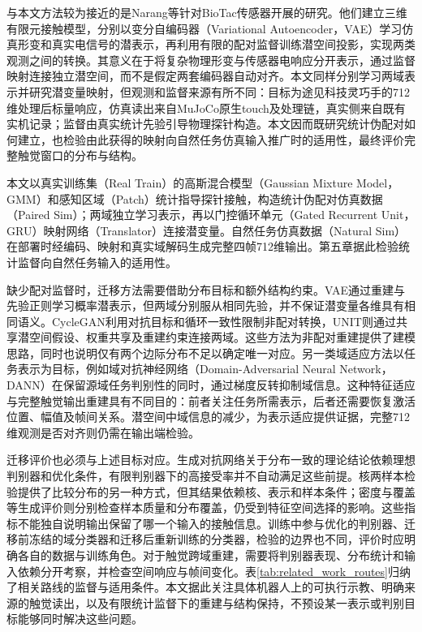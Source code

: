 与本文方法较为接近的是Narang等针对BioTac传感器开展的研究。他们建立三维有限元接触模型，分别以变分自编码器（Variational Autoencoder，VAE）学习仿真形变和真实电信号的潜表示，再利用有限的配对监督训练潜空间投影，实现两类观测之间的转换\cite{narang2021latentprojections}。其意义在于将复杂物理形变与传感器电响应分开表示，通过监督映射连接独立潜空间，而不是假定两套编码器自动对齐。本文同样分别学习两域表示并研究潜变量映射，但观测和监督来源有所不同：目标为途见科技灵巧手的712维处理后标量响应，仿真读出来自MuJoCo原生touch及处理链，真实侧来自既有实机记录；监督由真实统计先验引导物理探针构造。本文因而既研究统计伪配对如何建立，也检验由此获得的映射向自然任务仿真输入推广时的适用性，最终评价完整触觉窗口的分布与结构。

本文以真实训练集（Real Train）的高斯混合模型（Gaussian Mixture Model，GMM）和感知区域（Patch）统计指导探针接触，构造统计伪配对仿真数据（Paired Sim）；两域独立学习表示，再以门控循环单元（Gated Recurrent Unit，GRU）映射网络（Translator）连接潜变量。自然任务仿真数据（Natural Sim）在部署时经编码、映射和真实域解码生成完整四帧712维输出。第五章据此检验统计监督向自然任务输入的适用性。

缺少配对监督时，迁移方法需要借助分布目标和额外结构约束。VAE通过重建与先验正则学习概率潜表示，但两域分别服从相同先验，并不保证潜变量各维具有相同语义\cite{kingma2014vae}。CycleGAN利用对抗目标和循环一致性限制非配对转换，UNIT则通过共享潜空间假设、权重共享及重建约束连接两域\cite{zhu2017cyclegan,liu2017unit}。这些方法为非配对重建提供了建模思路，同时也说明仅有两个边际分布不足以确定唯一对应。另一类域适应方法以任务表示为目标，例如域对抗神经网络（Domain-Adversarial Neural Network，DANN）在保留源域任务判别性的同时，通过梯度反转抑制域信息\cite{ganin2016dann}。这种特征适应与完整触觉输出重建具有不同目的：前者关注任务所需表示，后者还需要恢复激活位置、幅值及帧间关系。潜空间中域信息的减少，为表示适应提供证据，完整712维观测是否对齐则仍需在输出端检验。

迁移评价也必须与上述目标对应。生成对抗网络关于分布一致的理论结论依赖理想判别器和优化条件，有限判别器下的高接受率并不自动满足这些前提\cite{goodfellow2014gan}。核两样本检验提供了比较分布的另一种方式，但其结果依赖核、表示和样本条件\cite{gretton2012mmd}；密度与覆盖等生成评价则分别检查样本质量和分布覆盖，仍受到特征空间选择的影响\cite{naeem2020metrics}。这些指标不能独自说明输出保留了哪一个输入的接触信息。训练中参与优化的判别器、迁移前冻结的域分类器和迁移后重新训练的分类器，检验的边界也不同，评价时应明确各自的数据与训练角色。对于触觉跨域重建，需要将判别器表现、分布统计和输入依赖分开考察，并检查空间响应与帧间变化。表\ref{tab:related_work_routes}归纳了相关路线的监督与适用条件。本文据此关注具体机器人上的可执行示教、明确来源的触觉读出，以及有限统计监督下的重建与结构保持，不预设某一表示或判别目标能够同时解决这些问题。

